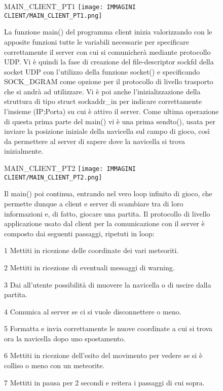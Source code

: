 \documentclass{article}
\begin{document}
\begin{enumerate}
    \begin{figure}[!htb]
        \item MAIN\_CLIENT\_PT1
        \centering
        \texttt{[image: IMMAGINI CLIENT/MAIN\_CLIENT\_PT1.png]}
        \raggedright\par
        La funzione main() del programma client inizia valorizzando con le apposite funzioni tutte le variabili necessarie per specificare correttamente il server con cui si comunicherà mediante protocollo UDP. \newline
        Vi è quindi la fase di creazione del file-descriptor sockfd della socket UDP con l'utilizzo della funzione socket() e specificando SOCK\_DGRAM come opzione per il protocollo di livello trasporto che si andrà ad utilizzare. \newline
        Vi è poi anche l'inizializzazione della struttura di tipo struct sockaddr\_in per indicare correttamente l'insieme (IP;Porta) su cui è attivo il server.
        Come ultima operazione di questa prima parte del main() vi è una prima sendto(), usata per inviare la posizione iniziale della navicella sul campo di gioco, così da permettere al server di sapere dove la navicella si trova inizialmente.
    \end{figure}
    
    \newpage
    
    \begin{figure}[!htb]
        \item MAIN\_CLIENT\_PT2
        \centering
        \texttt{[image: IMMAGINI CLIENT/MAIN\_CLIENT\_PT2.png]}    
        \raggedright\par
        Il main() poi continua, entrando nel vero loop infinito di gioco, che permette dunque a client e server di scambiare tra di loro informazioni e, di fatto, giocare una partita.
        Il protocollo di livello applicazione usato dal client per la comunicazione con il server è composto dai seguenti passaggi, ripetuti in loop:
        \item[1] Mettiti in ricezione delle coordinate dei vari meteoriti.
        \item[2] Mettiti in ricezione di eventuali messaggi di warning.
        \item[3] Dai all'utente possibilità di muovere la navicella o di uscire dalla partita.
        \item[4] Comunica al server se ci si vuole disconnettere o meno.
        \item[5] Formatta e invia correttamente le nuove coordinate a cui si trova ora la navicella dopo uno spostamento.
        \item[6] Mettiti in ricezione dell'esito del movimento per vedere se si è colliso o meno con un meteorite.
        \item[7] Mettiti in pausa per 2 secondi e reitera i passaggi di cui sopra.
    \end{figure}        
    \end{enumerate}
\end{document}
